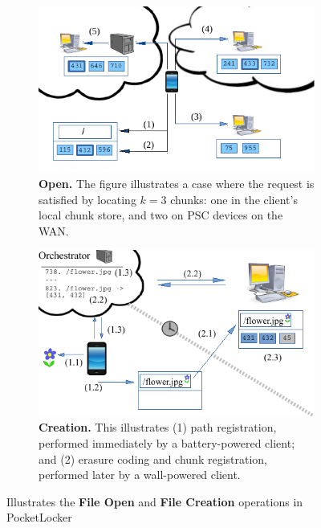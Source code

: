 \begin{figure}[t]

  \begin{subfigure}[t]{\columnwidth}

    \includegraphics[width=\columnwidth]{./figures/open.pdf}

    \caption{\small \textbf{Open.} The figure illustrates a case where the
      request is satisfied by locating $k = 3$ chunks: one in the client's
    local chunk store, and two on PSC devices on the WAN.}

    \label{fig-design-open}
  \end{subfigure}\hfill
  \begin{subfigure}[t]{\columnwidth}

    \includegraphics[width=\columnwidth]{./figures/create.pdf}

    \caption{\small \textbf{Creation.} This illustrates (1) path registration,
      performed immediately by a battery-powered client; and (2) erasure coding
    and chunk registration, performed later by a wall-powered client.}

    \label{fig-design-creation}
  \end{subfigure}
  \vspace*{-0.1in}

  \caption{Illustrates the \small \textbf{File Open} and \small \textbf{File Creation} operations in PocketLocker}

  \vspace*{-0.2in}
\end{figure}


